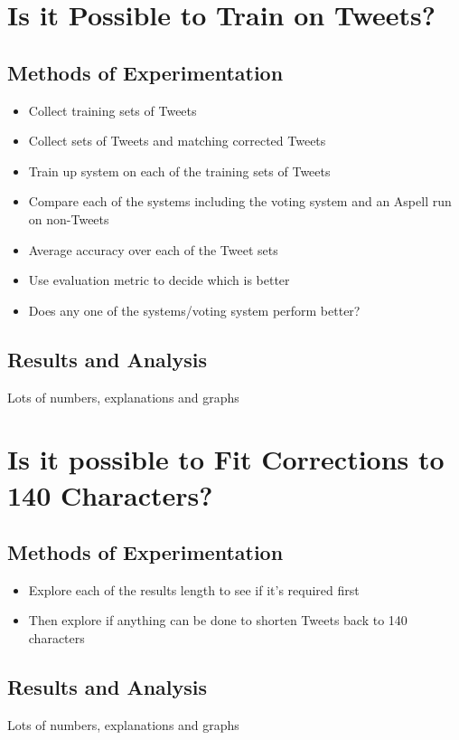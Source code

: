 \section{Is it Possible to Train on Tweets?}
\subsection{Methods of Experimentation}
\begin{itemize}
	\item Collect training sets of Tweets
	\item Collect sets of Tweets and matching corrected Tweets
	\item Train up system on each of the training sets of Tweets
	\item Compare each of the systems including the voting system and an Aspell run on non-Tweets
	\item Average accuracy over each of the Tweet sets
	\item Use evaluation metric to decide which is better
	\item Does any one of the systems/voting system perform better?
\end{itemize}

\subsection{Results and Analysis}
Lots of numbers, explanations and graphs

\section{Is it possible to Fit Corrections to 140 Characters?}
\subsection{Methods of Experimentation}
\begin{itemize}
	\item Explore each of the results length to see if it's required first
	\item Then explore if anything can be done to shorten Tweets back to 140 characters
\end{itemize}

\subsection{Results and Analysis}
Lots of numbers, explanations and graphs
